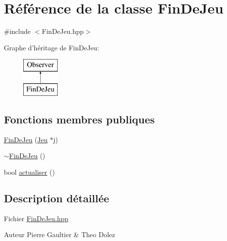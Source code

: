 \hypertarget{class_fin_de_jeu}{\section{Référence de la classe Fin\-De\-Jeu}
\label{class_fin_de_jeu}
}


{\ttfamily \#include $<$Fin\-De\-Jeu.\-hpp$>$}

Graphe d'héritage de Fin\-De\-Jeu\-:\begin{figure}[H]
\begin{center}
\leavevmode
\includegraphics[height=2.000000cm]{class_fin_de_jeu}
\end{center}
\end{figure}
\subsection*{Fonctions membres publiques}
\begin{DoxyCompactItemize}
\item 
\hyperlink{class_fin_de_jeu_af86c4d468aec3ffb9ed59c02016aadcf}{Fin\-De\-Jeu} (\hyperlink{class_jeu}{Jeu} $\ast$j)
\item 
\hyperlink{class_fin_de_jeu_a7f80425c93ed96eadb13ac5e7bb51bd4}{$\sim$\-Fin\-De\-Jeu} ()
\item 
bool \hyperlink{class_fin_de_jeu_a79c3fb0a9e367cd3e62da14af840f871}{actualiser} ()
\end{DoxyCompactItemize}


\subsection{Description détaillée}
Fichier \hyperlink{_fin_de_jeu_8hpp}{Fin\-De\-Jeu.\-hpp} \begin{DoxyAuthor}{Auteur}
Pierre Gaultier \& Theo Dolez 
\end{DoxyAuthor}



